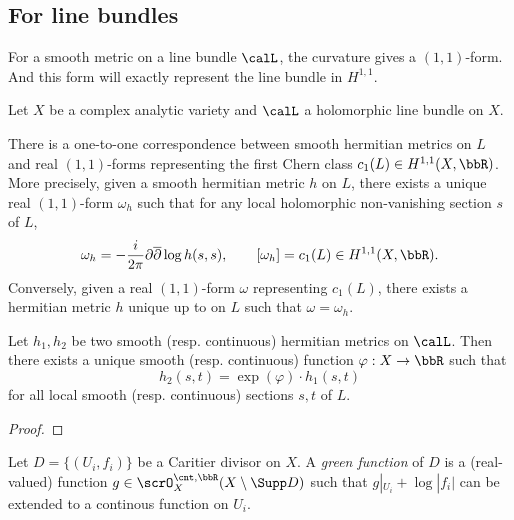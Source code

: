 


\subsection{For line bundles}

For a smooth metric on a line bundle $\calL$, the curvature \Yang{} gives a $(1,1)$-form.
And this form will exactly represent the line bundle in $H^{1,1}$.

Let \(X\) be a complex analytic variety and $\calL$ a holomorphic line bundle on $X$.

\begin{proposition}\label{prop:correspondence_between_hermitian_metric_and_forms}
	There is a one-to-one correspondence between smooth hermitian metrics on \(L\) and real \((1,1)\)-forms representing the first Chern class \(c_1(L) \in H^{1,1}(X, \bbR)\).
	More precisely, given a smooth hermitian metric \(h\) on \(L\), there exists a unique real \((1,1)\)-form \(\omega_h\) such that for any local holomorphic non-vanishing section \(s\) of \(L\),
	\[\omega_h = -\frac{i}{2\pi} \partial \overline{\partial} \log h(s,s), \qquad [\omega_h] = c_1(L) \in H^{1,1}(X,\bbR).\]
	Conversely, given a real \((1,1)\)-form \(\omega\) representing \(c_1(L)\), there exists a hermitian metric \(h\) unique up to \Yang{} on \(L\) such that \(\omega = \omega_h\).
\end{proposition}


\begin{proposition}\label{prop:hermitian_metric_different_by_a_smooth_function_on_a_fixed_line_bundle}
	Let \(h_1,h_2\) be two smooth (resp. continuous) hermitian metrics on $\calL$.
	Then there exists a unique smooth (resp. continuous) function \(\varphi: X \to \bbR\) such that
	\[h_2(s,t) = \exp(\varphi) \cdot h_1(s,t)\]
	for all local smooth (resp. continuous) sections \(s,t\) of \(L\).
\end{proposition}
\begin{proof}
\end{proof}

\begin{definition}\label{def:green-functions-for-a-divisor}
	Let $D = \{(U_i,f_i)\}$ be a Caritier divisor on $X$.
	A \emph{green function} of $D$ is a (real-valued) function $g \in \scrO_{X}^{\cnt,\bbR}(X \setminus \Supp D)$ such that $g|_{U_i} + \log |f_i|$ can be extended to a continous function on $U_i$.
\end{definition}

